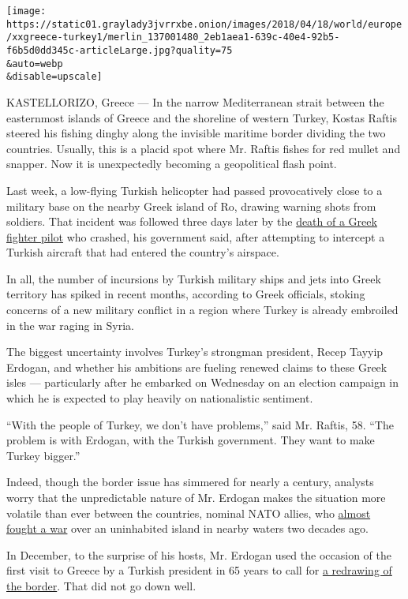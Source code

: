 \texttt{[image: https://static01.graylady3jvrrxbe.onion/images/2018/04/18/world/europe/xxgreece-turkey1/merlin\_137001480\_2eb1aea1-639c-40e4-92b5-f6b5d0dd345c-articleLarge.jpg?quality=75\\\&auto=webp\\\&disable=upscale]}

KASTELLORIZO, Greece --- In the narrow Mediterranean strait between the
easternmost islands of Greece and the shoreline of western Turkey,
Kostas Raftis steered his fishing dinghy along the invisible maritime
border dividing the two countries. Usually, this is a placid spot where
Mr. Raftis fishes for red mullet and snapper. Now it is unexpectedly
becoming a geopolitical flash point.

Last week, a low-flying Turkish helicopter had passed provocatively
close to a military base on the nearby Greek island of Ro, drawing
warning shots from soldiers. That incident was followed three days later
by the
\href{https://www.nytimes3xbfgragh.onion/2018/04/12/world/europe/greece-turkey-fighter-jet.html}{death
of a Greek fighter pilot} who crashed, his government said, after
attempting to intercept a Turkish aircraft that had entered the
country's airspace.

In all, the number of incursions by Turkish military ships and jets into
Greek territory has spiked in recent months, according to Greek
officials, stoking concerns of a new military conflict in a region where
Turkey is already embroiled in the war raging in Syria.

The biggest uncertainty involves Turkey's strongman president, Recep
Tayyip Erdogan, and whether his ambitions are fueling renewed claims to
these Greek isles --- particularly after he embarked on Wednesday on an
election campaign in which he is expected to play heavily on
nationalistic sentiment.

``With the people of Turkey, we don't have problems,'' said Mr. Raftis,
58. ``The problem is with Erdogan, with the Turkish government. They
want to make Turkey bigger.''

Indeed, though the border issue has simmered for nearly a century,
analysts worry that the unpredictable nature of Mr. Erdogan makes the
situation more volatile than ever between the countries, nominal NATO
allies, who
\href{https://www.nytimes3xbfgragh.onion/1996/02/01/world/charges-fly-as-the-greeks-and-turks-avert-a-war.html}{almost
fought a war} over an uninhabited island in nearby waters two decades
ago.

In December, to the surprise of his hosts, Mr. Erdogan used the occasion
of the first visit to Greece by a Turkish president in 65 years to call
for
\href{https://www.nytimes3xbfgragh.onion/2017/12/07/world/europe/erdogan-greece-turkey-visit.html}{a
redrawing of the border}. That did not go down well.

